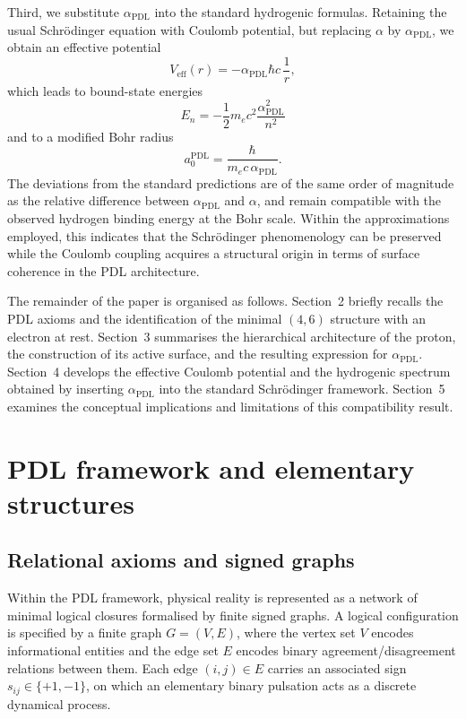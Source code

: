 \documentclass[12pt,a4paper]{article}
\begin{document}
Third, we substitute \(\alpha_{\text{PDL}}\) into the standard hydrogenic formulas. Retaining the usual Schr\"odinger equation with Coulomb potential, but replacing \(\alpha\) by \(\alpha_{\text{PDL}}\), we obtain an effective potential
\[
  V_{\text{eff}}(r) = -\alpha_{\text{PDL}}\hbar c\,\frac{1}{r},
\]
which leads to bound-state energies
\[
  E_n = -\frac{1}{2} m_e c^2 \frac{\alpha_{\text{PDL}}^2}{n^2}
\]
and to a modified Bohr radius
\[
  a_0^{\text{PDL}} = \frac{\hbar}{m_e c\,\alpha_{\text{PDL}}}.
\]
The deviations from the standard predictions are of the same order of magnitude as the relative difference between \(\alpha_{\text{PDL}}\) and \(\alpha\), and remain compatible with the observed hydrogen binding energy at the Bohr scale. Within the approximations employed, this indicates that the Schr\"odinger phenomenology can be preserved while the Coulomb coupling acquires a structural origin in terms of surface coherence in the PDL architecture.

The remainder of the paper is organised as follows.
Section~2 briefly recalls the PDL axioms and the identification of the minimal \((4,6)\) structure with an electron at rest. Section~3 summarises the hierarchical architecture of the proton, the construction of its active surface, and the resulting expression for \(\alpha_{\text{PDL}}\). Section~4 develops the effective Coulomb potential and the hydrogenic spectrum obtained by inserting \(\alpha_{\text{PDL}}\) into the standard Schr\"odinger framework. Section~5 examines the conceptual implications and limitations of this compatibility result.

\section{PDL framework and elementary structures}

\subsection{Relational axioms and signed graphs}

Within the PDL framework, physical reality is represented as a network of minimal logical closures formalised by finite signed graphs.\cite{Laubscher2026IntroPDL,Laubscher2026PDL_English,Laubscher2026LDP_French} A logical configuration is specified by a finite graph \(G = (V,E)\), where the vertex set \(V\) encodes informational entities and the edge set \(E\) encodes binary agreement/disagreement relations between them. Each edge \((i,j)\in E\) carries an associated sign \(s_{ij}\in\{+1,-1\}\), on which an elementary binary pulsation acts as a discrete dynamical process.
\end{document}
